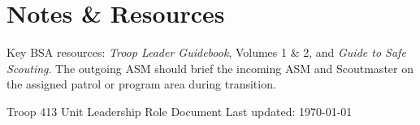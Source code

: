 \documentclass[11pt, letterpaper]{article}
\begin{document}
\vspace{0.4em}

\section{Notes \& Resources}
Key BSA resources: \textit{Troop Leader Guidebook}, Volumes 1 \& 2, and \textit{Guide to Safe Scouting}. The outgoing ASM should brief the incoming ASM and Scoutmaster on the assigned patrol or program area during transition.

\vfill
\begin{center}
  \footnotesize\color{gray}
  Troop 413 \textbullet{} Unit Leadership Role Document \textbullet{} Last updated: \today
\end{center}
\end{document}
